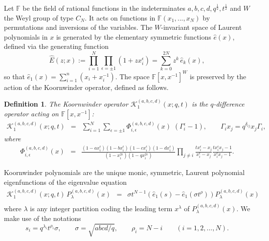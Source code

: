 \documentclass[12pt]{amsart}
\newtheorem{defn}[thm]{Definition}
\newcommand{\K}{{\mathcal K}}
\newcommand{\half}{\frac{1}{2}}
\numberwithin{equation}{section}
\begin{document}
Let $\mathbb F$ be the field of rational functions in the indeterminates $a,b,c,d, q^{\half},t^{\half}$ and  $W$ the Weyl group of type $C_N$. It acts on functions in $\mathbb F(x_1,...,x_N)$
by permutations and inversions of the variables. The $W$-invariant space of Laurent polynomials in $x$ is generated by
 the elementary symmetric functions $\hat e(x)$, defined via the generating function
\begin{equation}\label{Chatdef}
{\hat E}(z;x):=\prod_{i=1}^N\prod_{\epsilon=\pm 1} (1+z x_i^\epsilon)=\sum_{k=0}^{2N} z^k\, {\hat e}_k(x),
\end{equation}
so that ${\hat e}_1(x)=\sum_{i=1}^n( x_i+x_i^{-1})$. The space $\mathbb F[x,x^{-1}]^W$ is preserved by the action of the Koornwinder operator, defined as follows.
\begin{defn}
The Koornwinder operator $\K_1^{(a,b,c,d)}(x;q,t)$ is the  $q$-difference operator acting on $\mathbb F[x,x^{-1}]$:
\begin{eqnarray} 
\K_1^{(a,b,c,d)}(x;q,t)&=&\sum_{i=1}^N\sum_{ \epsilon=\pm 1} \Phi_{i,\epsilon}^{(a,b,c,d)}(x) \, 
 \, (\Gamma_i^{\epsilon}-1) ,\qquad \Gamma_i x_j = q^{\delta_{ij}} x_j \Gamma_i, \label{koorn} 
 \end{eqnarray}
 where
 \begin{eqnarray*}
\Phi_{i,\epsilon}^{(a,b,c,d)}(x) &=&\frac{(1-a x_i^{\epsilon})(1-b x_i^{\epsilon})(1-c x_i^{\epsilon})(1-d x_i^{\epsilon})}{(1-x_i^{2\epsilon})(1-q x_i^{2\epsilon})}\prod_{j\neq i} \frac{t x_i^\epsilon-x_j}{x_i^\epsilon-x_j}\frac{t x_i^\epsilon x_j-1}{x_i^\epsilon x_j-1}.\nonumber 
\end{eqnarray*}
\end{defn}
%
%
%
%
%
%

Koornwinder polynomials are the unique monic, symmetric, Laurent polynomial eigenfunctions of the eigenvalue equation
%
\begin{eqnarray*}\K_1^{(a,b,c,d)}(x;q,t) \, P_\lambda^{(a,b,c,d)}(x)&=&
%
\sigma t^{N-1} \left( \hat e_1(s)- \hat e_1(\sigma t^\rho) \right) P_\lambda^{(a,b,c,d)}(x)\\
%
\end{eqnarray*}
where $\lambda$ is any integer partition coding the leading term $x^\lambda$ of $P_\lambda^{(a,b,c,d)}(x)$. We make use of the notations
%
\begin{equation}\label{sabcd}
s_i=q^{\lambda_i} t^{\rho_i} \sigma, \qquad \sigma=\sqrt{{abcd}/{q}}, \qquad \rho_i=N-i \qquad(i=1,2,...,N).
\end{equation}
\end{document}
